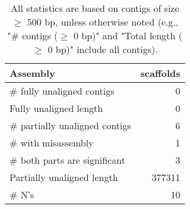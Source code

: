 \documentclass[12pt,a4paper]{article}
\begin{document}
\begin{table}[ht]
\begin{center}
\caption{All statistics are based on contigs of size $\geq$ 500 bp, unless otherwise noted (e.g., "\# contigs ($\geq$ 0 bp)" and "Total length ($\geq$ 0 bp)" include all contigs).}
\begin{tabular}{|l*{1}{|r}|}
\hline
Assembly & scaffolds \\ \hline
\# fully unaligned contigs & 0 \\ \hline
Fully unaligned length & 0 \\ \hline
\# partially unaligned contigs & 6 \\ \hline
\hspace{5mm}\# with misassembly & 1 \\ \hline
\hspace{5mm}\# both parts are significant & 3 \\ \hline
Partially unaligned length & 377311 \\ \hline
\# N's & 10 \\ \hline
\end{tabular}
\end{center}
\end{table}
\end{document}
